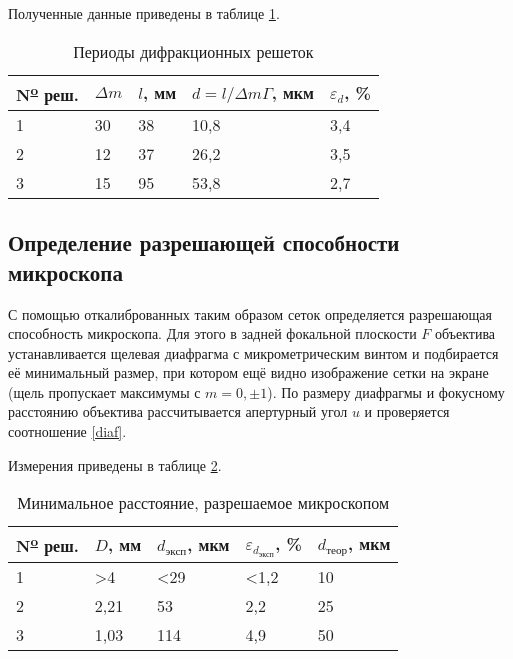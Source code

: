 \documentclass[a4paper,12pt]{article} %
\begin{document}
Полученные данные приведены в таблице \ref{d'}.

\begin{table}[H]
    \centering
    \begin{tabular}{|p{2cm}|l|p{2cm}|l|l|}
        \hline N\textsuperscript{\underline{o}} реш. & $\Delta m$ & $l$, мм & $\displaystyle d= l/\Delta m\Gamma$, мкм & $\varepsilon_d$, \% \\ \hline
        1& 30 & 38 & 10,8 & 3,4 \\ \hline
        2& 12 & 37 & 26,2 & 3,5 \\ \hline
        3& 15 & 95 & 53,8 & 2,7 \\ \hline
    \end{tabular}
    \caption{Периоды дифракционных решеток}
    \label{d'}
\end{table}

\subsection{Определение разрешающей способности микроскопа}

С помощью откалиброванных таким образом сеток определяется разрешающая способность микроскопа. Для этого в задней фокальной плоскости $F$ объектива устанавливается щелевая диафрагма с микрометрическим винтом и подбирается её минимальный размер, при котором ещё видно изображение сетки на экране (щель пропускает максимумы с $m = 0, \pm 1$). По размеру диафрагмы и фокусному расстоянию объектива рассчитывается апертурный угол $u$ и проверяется соотношение \eqref{diaf}.

Измерения приведены в таблице \ref{D}.

\begin{table}[H]
    \centering
    \begin{tabular}{|p{2cm}|p{2cm}|p{2cm}|p{2cm}|p{2cm}|}
        \hline N\textsuperscript{\underline{o}} реш. & $D$, мм & $d_{\text{эксп}}$, мкм & $\varepsilon_{d_{\text{эксп}}}$, \% & $d_{\text{теор}}$, мкм \\ \hline
        1& >4   & <29  & <1,2& 10 \\ \hline
        2& 2,21 & 53   & 2,2 & 25 \\ \hline
        3& 1,03 & 114  & 4,9 & 50 \\ \hline
        
    \end{tabular}
    \caption{Минимальное расстояние, разрешаемое микроскопом}
    \label{D}
\end{table}
\end{document}
